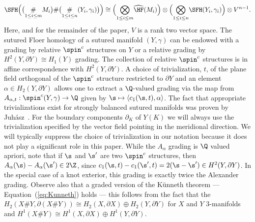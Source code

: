 \documentclass{amsart}
\theoremstyle{definition}
\theoremstyle{remark}
\numberwithin{equation}{section}
\begin{document}
\begin{equation}\label{eq:Kunneth}
    \SFH\Big(\big(\underset{1\leq i\leq m}{\#}M_i\big)\#\big(\underset{1\leq i\leq n}{\#}(Y_i,\gamma_i)\big)\Big)\cong \Big(\underset{1\leq i\leq m}{\bigotimes}\widehat{\HF}(M_i)\Big)\otimes \Big(\underset{1\leq i\leq n}{\bigotimes}\SFH(Y_i,\gamma_i)\Big)\otimes V^{n-1}.
\end{equation}
Here, and for the remainder of the paper, $V$ is a rank two vector space. The sutured Floer homology of a sutured manifold $(Y,\gamma)$ can be endowed with a grading by relative $\spin^c$ structures on $Y$ or a relative grading by $H^2(Y,\partial Y)\cong H_1(Y)$ grading. The collection of relative $\spin^c$ structures is in affine correspondence with $H^2(Y,\partial Y)$. A choice of trivialization, $t$, of the plane field orthogonal of the $\spin^c$ structure restricted to $\partial Y$ and an element $\alpha\in H_2(Y,\partial Y)$ allows one to extract a $\Q$-valued grading via the map from ${A_{\alpha,t}:\spin^c(Y,\gamma)\to\Q}$ given by $\s\mapsto \langle c_1(\s,t),\alpha\rangle$. The fact that appropriate trivializations exist for strongly balanced sutured manifolds was proven by Juh\'asz~\cite[Propositon 3.4]{juhasz2008floer}. For the boundary components $\partial_K$ of $Y(K)$ we will always use the trivialization specified by the vector field pointing in the meridional direction. We will typically suppress the choice of trivialization in our notation because it does not play a significant role in this paper. While the $A_{\alpha}$ grading is $\Q$ valued apriori, note that if $\s$ and $\s'$ are two $\spin^c$ structures, then $A_\alpha(\s)-A_\alpha(\s')\in 2\Z$, since $c_1(\s,t)-c_1(\s',t)=2(\s-\s')\in H^2(Y,\partial Y)$. In the special case of a knot exterior, this grading is exactly twice the Alexander grading. Observe also that a graded version of the K\"unneth theorem --- Equation~(\ref{eq:Kunneth}) holds --- this follows from the fact that the $H_2(X\#Y,\partial(X\#Y))\cong H_2(X,\partial X)\oplus H_2(Y,\partial Y)$ for $X$ and $Y$ $3$-manifolds and $H^1(X\#Y)\cong H^1(X,\partial X)\oplus H^1(Y,\partial Y)$.
\end{document}
